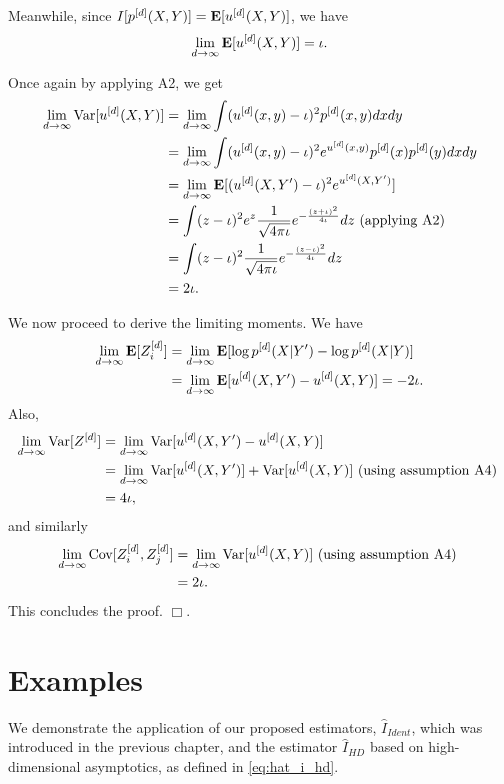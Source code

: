 Meanwhile, since $I[p^{[d]}(X, Y)] = \textbf{E}[u^{[d]}(X, Y)]$, we have
\[\lim_{d \to \infty} \textbf{E}[u^{[d]}(X, Y)] = \iota.\]

Once again by applying A2, we get
\begin{align*}
\lim_{d \to \infty} \text{Var}[u^{[d]}(X, Y)] 
&= \lim_{d \to \infty} \int (u^{[d]}(x, y) - \iota)^2 p^{[d]}(x, y) dx dy
\\&= \lim_{d \to \infty} \int (u^{[d]}(x, y) - \iota)^2 e^{u^{[d]}(x, y)} p^{[d]}(x) p^{[d]}(y) dx dy
\\&= \lim_{d \to \infty} \textbf{E}[(u^{[d]}(X, Y') - \iota)^2 e^{u^{[d]}(X, Y')}] 
\\&= \int (z - \iota)^2 e^z \frac{1}{\sqrt{4\pi\iota}} e^{-\frac{(z+\iota)^2}{4\iota}} dz \text{ (applying A2)}
\\&= \int (z - \iota)^2 \frac{1}{\sqrt{4\pi\iota}} e^{-\frac{(z-\iota)^2}{4\iota}} dz
\\&= 2\iota.
\end{align*}


We now proceed to derive the limiting moments.
We have
\begin{align*}
\lim_{d \to \infty} \textbf{E}[Z^{[d]}_i] 
&= \lim_{d \to \infty} \textbf{E}[ \log p^{[d]}(X|Y') - \log p^{[d]}(X|Y)]
\\&= \lim_{d \to \infty} \textbf{E}[ u^{[d]}(X, Y') - u^{[d]}(X, Y) ] = -2\iota.
\end{align*}
Also,
\begin{align*}
\lim_{d \to \infty} \text{Var}[Z^{[d]}]
 &= \lim_{d \to \infty} \text{Var}[ u^{[d]}(X, Y') - u^{[d]}(X, Y) ]
\\&= \lim_{d \to \infty} \text{Var}[ u^{[d]}(X, Y')] +\text{Var}[ u^{[d]}(X, Y) ]\text{ (using assumption A4) }
\\&= 4\iota,
\end{align*}
and similarly
\begin{align*}
\lim_{d \to \infty} \text{Cov}[Z_i^{[d]}, Z_j^{[d]}]
&= \lim_{d \to \infty} \text{Var}[ u^{[d]}(X, Y)]\text{ (using assumption A4) }
\\&= 2\iota.
\end{align*}
This concludes the proof. $\Box$.

\section{Examples}

We demonstrate the application of our proposed estimators,
$\hat{I}_{Ident}$, which was introduced in the previous chapter, and
the estimator $\hat{I}_{HD}$ based on high-dimensional asymptotics, as
defined in \eqref{eq:hat_i_hd}.

